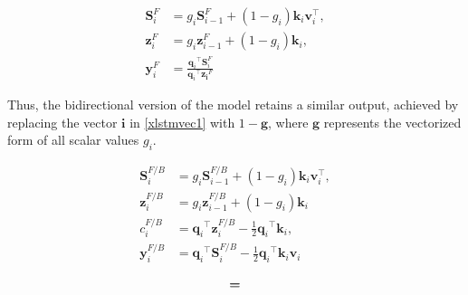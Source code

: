 \begin{align}
     \mathbf{S}_i^F &=   g_i\mathbf{S}_{i-1}^F + (1-g_i)\mathbf{k}_i \mathbf{v}_i^{\top}, \\
     \mathbf{z}_i^F & =   g_i\mathbf{z}_{i-1}^F + (1-g_i){\mathbf{k}_i}, \\
     \mathbf{y}_i^F &= \frac{{{\mathbf{q}_i}}^{\top}  \mathbf{S}_i^F}{{{\mathbf{q}_i}}^{\top}  \mathbf{z_i}^F} 
\end{align}

Thus, the bidirectional version of the model retains a similar output, achieved by replacing the vector \(\mathbf{i}\) in \eqref{xlstmvec1} with \(1 - \mathbf{g}\), where \(\mathbf{g}\) represents the vectorized form of all scalar values \(g_i\).

\begin{minipage}[t]{0.475\textwidth}
\begin{whitebox}
    \begin{align}
        \mathbf{S}^{F/B}_i &= g_i\mathbf{S}^{F/B}_{i-1} + (1-g_i)\mathbf{k}_i \mathbf{v}_i^{\top}, \\
    \mathbf{z}^{F/B}_i & =  g_i\mathbf{z}^{F/B}_{i-1} +  (1-g_i)\mathbf{k}_i \\
    c^{F/B}_i & =  {{{\mathbf{q}_i}}^{\top} \mathbf{z}^{F/B}_{i}} - \frac{1}{2}{{\mathbf{q}_i}}^{\top} \mathbf{k}_i, \\
    \mathbf{y}^{F/B}_i &= {{{\mathbf{q}_i}}^{\top} \mathbf{S}^{F/B}_i}  - \frac{1}{2}{{\mathbf{q}_i}}^{\top} \mathbf{k}_i \mathbf{v}_i 
    \end{align}
\end{whitebox}
\end{minipage}
\begin{minipage}[t]{0.01\textwidth}
\vspace{-2.3cm}
    \begin{align}
       \textbf{=} \notag
    \end{align}
\end{minipage}


